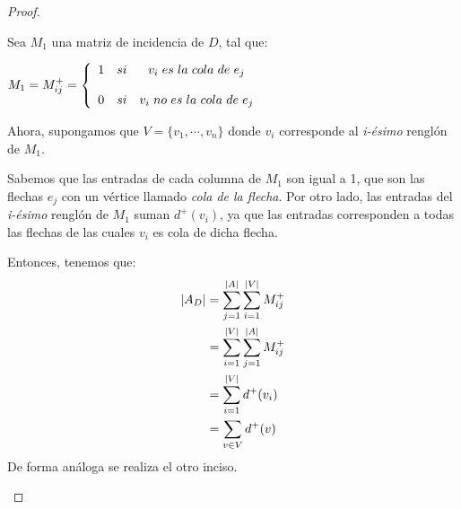 \documentclass{article}
\begin{document}
\begin{enumerate}
\begin{proof}
\begin{itemize}
          Sea $M_{1}$ una matriz de incidencia de $D$, tal que:
          \begin{center}
            $M_{1} = M^{+}_{ij}
            = \left \{
            \begin{array}{lcc}
              1 &   si  & v_{i} \hspace{0.3em} es \hspace{0.3em} la
              \hspace{0.3em} cola \hspace{0.3em} de \hspace{0.3em} e_{j} \\
              \\0 &  si & v_{i} \hspace{0.3em} no \hspace{0.3em} es \hspace{0.3em}
              la \hspace{0.3em} cola \hspace{0.3em} de \hspace{0.3em} e_{j}
            \end{array}
            \right.$
          \end{center}
          Ahora, supongamos que $V = \{v_{1}, \dotsm, v_{n}\}$ donde $v_{i}$
          corresponde al \textit{i-\'esimo} rengl\'on de $M_{1}$.

          Sabemos que las entradas de cada columna de $M_{1}$ son igual a 1,
          que son las flechas $e_{j}$ con un v\'ertice llamado \textit{cola de la flecha}.
          Por otro lado, las entradas del \textit{i-\'esimo} rengl\'on de $M_{1}$
          suman $d^{+}(v_{i})$, ya que las entradas corresponden a todas las
          flechas de las cuales $v_{i}$ es cola de dicha flecha.

          Entonces, tenemos que:
          \begin{equation*}
            \begin{split}
              \abs{A_{D}} & = \sum_{j=1}^{\abs{A}} \sum_{i=1}^{\abs{V}} M^{+}_{ij} \\
              & = \sum_{i=1}^{\abs{V}} \sum_{j=1}^{\abs{A}} M^{+}_{ij} \\
              & = \sum_{i=1}^{\abs{V}} d^{+}(v_{i}) \\
              & = \sum_{v \in V} d^{+}(v)
            \end{split}
          \end{equation*}
          De forma an\'aloga se realiza el otro inciso.


\end{itemize}
\end{proof}
\end{enumerate}
\end{document}
